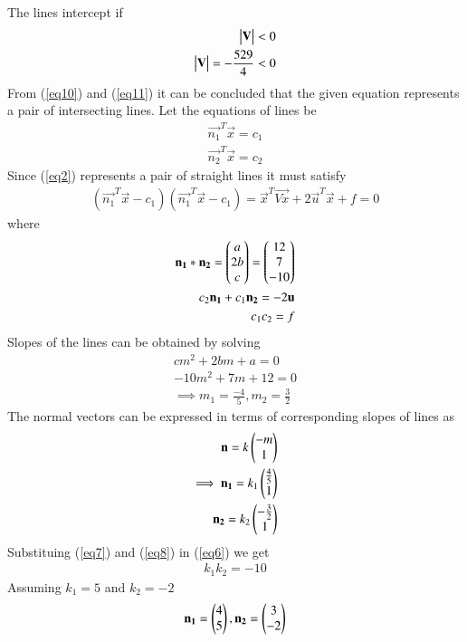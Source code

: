 \documentclass[journal,12pt,twocolumn]{IEEEtran}
\begin{document}
The lines intercept if
\begin{align}
        \mydet{\vec{V}} < 0 \\
 	\mydet{\vec{V}}=-\frac{529}{4} < 0 \label{eq11}
\end{align}
From (\ref{eq10}) and (\ref{eq11}) it can be concluded that the given equation represents a pair of intersecting lines.
Let the equations of lines be
\begin{align}
	\vec{n_1}^T \vec{x}=c_1 \\
	\vec{n_2}^T \vec{x}=c_2 
\end{align}
Since (\ref{eq2}) represents a pair of straight lines it must satisfy
\begin{align}
	(\vec{n_1}^T \vec{x} - c_1)(\vec{n_1}^T \vec{x} - c_1) =
        \vec{x}^{T}\vec{Vx} + 2\vec{u}^{T}\vec{x} + f=0
\end{align}
where
\begin{align}
	\vec{n_1}*\vec{n_2}=\myvec{a\\2b\\c}=\myvec{12\\7\\-10} \label{eq6} \\ 
	c_2\vec{n_1}+c_1\vec{n_2}=-2\vec{u} \label{eq9}\\
	c_1c_2=f
\end{align}
Slopes of the lines can be obtained by solving 
\begin{align}
	cm^2+2bm+a=0 \\
	-10m^2+7m+12=0 \\
	\implies m_1 = \frac{-4}{5}, m_2 = \frac{3}{2}
\end{align}
The normal vectors can be expressed in terms of corresponding slopes of lines as
\begin{align}
	\vec{n}=k\myvec{-m\\1} \\
	\implies
	\vec{n_1}=k_1\myvec{\frac{4}{5} \\ 1}  \label{eq7} \\
	\vec{n_2}=k_2\myvec{-\frac{3}{2} \\ 1}  \label{eq8}
\end{align}
Substituing (\ref{eq7}) and (\ref{eq8}) in (\ref{eq6}) we get
\begin{align}
	k_1k_2=-10
\end{align}
Assuming $ k_1=5$ and $k_2 =-2$
\begin{align}
	\mathbf{n_1}=\begin{pmatrix}4\\5\end{pmatrix}, \mathbf{n_2}=\begin{pmatrix}3\\-2\end{pmatrix}
\end{align}
\end{document}
